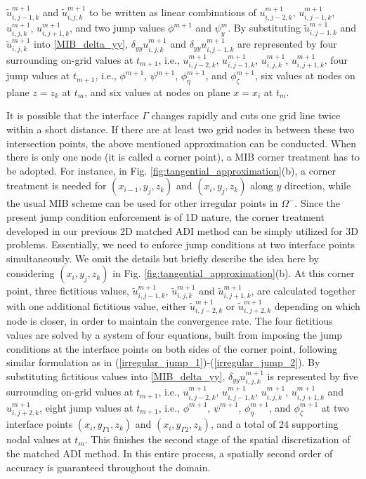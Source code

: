 \documentclass[dissertation]{uathesis}
\begin{document}
\begin{body}
$\tilde{u}^{m+1}_{i,j-1,k}$ and $\tilde{u}^{m+1}_{i,j,k}$ 
to be written as linear combinations of $u^{m+1}_{i,j-2,k}$, $u^{m+1}_{i,j-1,k}$, $u^{m+1}_{i,j,k}$, $u^{m+1}_{i,j+1,k}$, and two jump values $\phi^{m+1}$ and $\psi_{y}^m$.
By  substituting $\tilde{u}^{m+1}_{i,j-1,k}$ and $\tilde{u}^{m+1}_{i,j,k}$  into \eqref{MIB_delta_yy}, $\delta_{yy} u^{m+1}_{i,j,k}$ and $\delta_{yy} u^{m+1}_{i,j-1,k}$ are represented by four surrounding on-grid values at $t_{m+1}$, i.e., $u^{m+1}_{i,j-2,k}$, $u^{m+1}_{i,j-1,k}$, $u^{m+1}_{i,j,k}$, $u^{m+1}_{i,j+1,k}$, four jump values at $t_{m+1}$, i.e., $\phi^{m+1}$, $\psi^{m+1}$, $\phi_{\eta}^{m+1}$, and  $\phi_{\zeta}^{m+1}$, 
six values at nodes on plane $z=z_{k}$ at $t_{m}$,
and six values at nodes on plane $x=x_{i}$ at $t_{m}$.

It is possible that the interface $\Gamma$ changes rapidly and cuts one grid line twice within a short distance.
If there are at least two grid nodes in between these two intersection points, the above mentioned 
approximation can be conducted. 
When there is only one node (it is called a corner point), a MIB corner treatment has to be adopted. 
For instance, in Fig. \ref{fig:tangential_approximation}(b),
a corner treatment is needed for $(x_{i-1},y_j,z_k)$ and $(x_{i},y_j,z_k)$ along $y$ direction, 
while the usual MIB scheme can be used for other irregular points in $\Omega^-$. 
Since the present jump condition enforcement is of 1D nature, 
the corner treatment developed in our previous 2D matched ADI method \cite{zhao2015matched} can be simply utilized for 3D problems. 
Essentially, we need to enforce jump conditions at two interface points simultaneously. 
We omit the details but briefly describe the idea here by considering $(x_{i},y_j,z_k)$
in Fig. \ref{fig:tangential_approximation}(b). 
At this corner point, three fictitious values, $\tilde{u}^{m+1}_{i,j-1,k}$, $\tilde{u}^{m+1}_{i,j,k}$ and $\tilde{u}^{m+1}_{i,j+1,k}$, are calculated together with one additional fictitious value, either $\tilde{u}^{m+1}_{i,j-2,k}$ or $\tilde{u}^{m+1}_{i,j+2,k}$ depending on which node is closer, in order to maintain the convergence rate. The four fictitious values are solved by a system of four equations, built from imposing the jump conditions at the interface points on both sides of the corner point, following similar formulation as in (\ref{irregular_jump_1})-(\ref{irregular_jump_2}). 
By  substituting fictitious values into \eqref{MIB_delta_yy}, $\delta_{yy} u^{m+1}_{i,j,k}$ is  represented by five surrounding on-grid values at $t_{m+1}$, i.e., ${u}^{m+1}_{i,j-2,k}$, ${u}^{m+1}_{i,j-1,k}$, ${u}^{m+1}_{i,j,k}$, ${u}^{m+1}_{i,j+1,k}$ and ${u}^{m+1}_{i,j+2,k}$, 
eight jump values at $t_{m+1}$, i.e., $\phi^{m+1}$, $\psi^{m+1}$, $\phi_{\eta}^{m+1}$, and  $\phi_{\zeta}^{m+1}$ at two interface points $(x_i,y_{\Gamma1},z_k)$ and $(x_i,y_{\Gamma2},z_k)$, and a total of 24 supporting nodal values at $t_m$. 
This finishes the second stage of the spatial discretization of the matched ADI method. In this entire process, a spatially second order of accuracy is guaranteed throughout the domain. 


\end{body}
\end{document}
